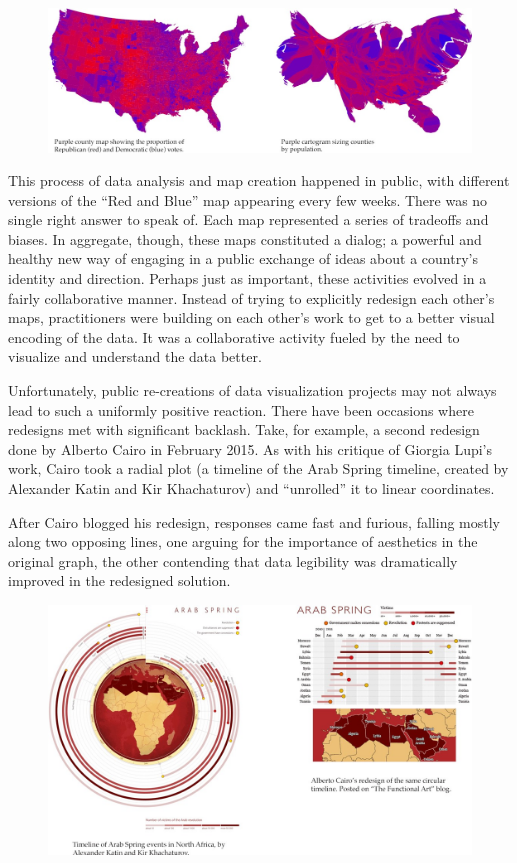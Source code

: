 \documentclass[sigconf,nonacm,screen,pbalance]{acmart}
\begin{document}
\begin{figure}[ht]
\centering
\includegraphics[width=\textwidth]{1_HRfH95w8UVsKETopIN14lQ.jpg}
\end{figure}


This process of data analysis and map creation happened in
public, with different versions of the ``Red and Blue'' map appearing every few weeks. There
was no single right answer to speak of. Each map represented a series of tradeoffs and
biases. In aggregate, though, these maps constituted a dialog; a powerful and healthy new
way of engaging in a public exchange of ideas about a country's identity and direction.
Perhaps just as important, these activities evolved in a fairly collaborative manner.
Instead of trying to explicitly redesign each other's maps, practitioners were building on
each other's work to get to a better visual encoding of the data. It was a collaborative
activity fueled by the need to visualize and understand the data better.

Unfortunately, public re-creations of data visualization
projects may not always lead to such a uniformly positive reaction. There have been
occasions where redesigns met with significant backlash. Take, for example, a second
redesign done by Alberto Cairo in February 2015. As with his critique of Giorgia Lupi's
work, Cairo took a radial plot (a timeline of the Arab Spring timeline, created by
Alexander Katin and Kir Khachaturov) and ``unrolled'' it to linear coordinates.

After Cairo blogged his redesign, responses came fast and
furious, falling mostly along two opposing lines, one arguing for the importance of
aesthetics in the original graph, the other contending that data legibility was
dramatically improved in the redesigned solution.




\begin{figure}[ht]
\centering
\includegraphics[width=\textwidth]{1_xIjO8n-Pp0Z4q1puoavP2g.jpg}
\end{figure}
\end{document}
